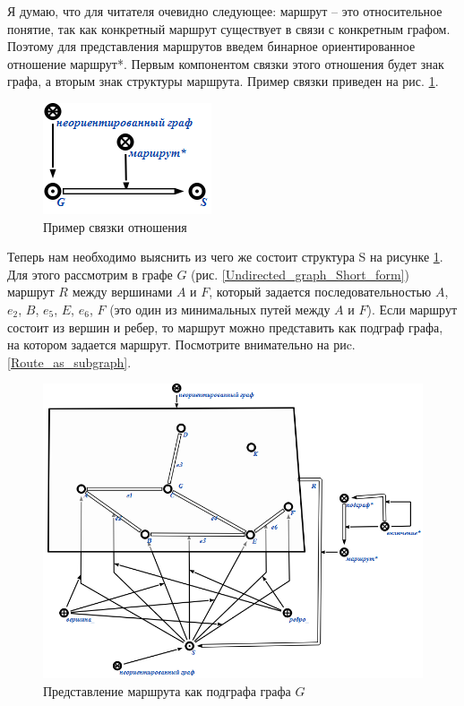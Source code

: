 Я думаю, что для читателя очевидно следующее: маршрут – это
относительное понятие, так как конкретный маршрут существует в связи с
конкретным графом. Поэтому для представления маршрутов введем бинарное
ориентированное отношение маршрут*. Первым компонентом связки этого
отношения будет знак графа, а вторым знак структуры маршрута. Пример
связки приведен на рис. \ref{fig:Example_of_relations_Route_tuple}.

\begin{figure}[h]
  \centering
  \includegraphics{images/2/Example_of_relations_Route_tuple}
  \caption{Пример связки отношения }
  \label{fig:Example_of_relations_Route_tuple}
\end{figure}

Теперь нам необходимо выяснить из чего же состоит структура S на
рисунке \ref{fig:Example_of_relations_Route_tuple}. Для этого
рассмотрим в графе $G$ (рис. \ref{Undirected_graph_Short_form})
маршрут $R$ между вершинами $A$ и $F$, который задается последовательностью
$A$, $e_2$, $B$, $e_5$, $E$, $e_6$, $F$ (это один из минимальных путей между $A$ и
$F$). Если маршрут состоит из вершин и ребер, то маршрут можно
представить как подграф графа, на котором задается маршрут. Посмотрите
внимательно на риc. \ref{Route_as_subgraph}.

\begin{figure}
  \centering
  \includegraphics[scale=0.8]{images/2/Route_as_subgraph}
  \caption{Представление маршрута как подграфа графа $G$}
  \label{fig:Route_as_subgraph}
\end{figure}

